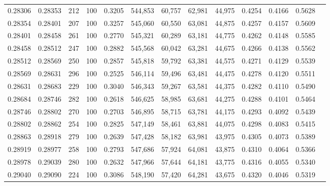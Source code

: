 \begin{tabular}{rrrrrrrrrrrrr}
0.28306 & 0.28353 &   212 & 100 &                                     0.3205 & 544,853 &  60,757 &  62,981 &  44,975 & 0.4254 & 0.4166 & 0.5628 \\
0.28354 & 0.28401 &   207 & 100 &                                     0.3257 & 545,060 &  60,550 &  63,081 &  44,875 & 0.4257 & 0.4157 & 0.5609 \\
0.28401 & 0.28458 &   261 & 100 &                                     0.2770 & 545,321 &  60,289 &  63,181 &  44,775 & 0.4262 & 0.4148 & 0.5585 \\
0.28458 & 0.28512 &   247 & 100 &                                     0.2882 & 545,568 &  60,042 &  63,281 &  44,675 & 0.4266 & 0.4138 & 0.5562 \\
0.28512 & 0.28569 &   250 & 100 &                                     0.2857 & 545,818 &  59,792 &  63,381 &  44,575 & 0.4271 & 0.4129 & 0.5539 \\
0.28569 & 0.28631 &   296 & 100 &                                     0.2525 & 546,114 &  59,496 &  63,481 &  44,475 & 0.4278 & 0.4120 & 0.5511 \\
0.28631 & 0.28683 &   229 & 100 &                                     0.3040 & 546,343 &  59,267 &  63,581 &  44,375 & 0.4282 & 0.4110 & 0.5490 \\
0.28684 & 0.28746 &   282 & 100 &                                     0.2618 & 546,625 &  58,985 &  63,681 &  44,275 & 0.4288 & 0.4101 & 0.5464 \\
0.28746 & 0.28802 &   270 & 100 &                                     0.2703 & 546,895 &  58,715 &  63,781 &  44,175 & 0.4293 & 0.4092 & 0.5439 \\
0.28802 & 0.28862 &   254 & 100 &                                     0.2825 & 547,149 &  58,461 &  63,881 &  44,075 & 0.4298 & 0.4083 & 0.5415 \\
0.28863 & 0.28918 &   279 & 100 &                                     0.2639 & 547,428 &  58,182 &  63,981 &  43,975 & 0.4305 & 0.4073 & 0.5389 \\
0.28919 & 0.28977 &   258 & 100 &                                     0.2793 & 547,686 &  57,924 &  64,081 &  43,875 & 0.4310 & 0.4064 & 0.5366 \\
0.28978 & 0.29039 &   280 & 100 &                                     0.2632 & 547,966 &  57,644 &  64,181 &  43,775 & 0.4316 & 0.4055 & 0.5340 \\
0.29040 & 0.29090 &   224 & 100 &                                     0.3086 & 548,190 &  57,420 &  64,281 &  43,675 & 0.4320 & 0.4046 & 0.5319 \\

\end{tabular}
